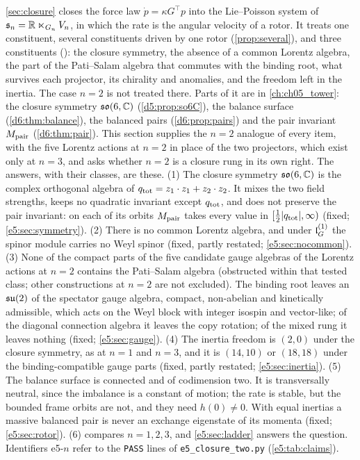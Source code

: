 \cref{sec:closure} closes the force law $\dot p=\kappa G^{\!\top}p$ into the Lie--Poisson system of $\mathfrak s_n=\mathbb{R}\ltimes_{G_n}V_n$,
in which the rate is the angular velocity of a rotor. It treats one constituent, several constituents driven by one rotor (\cref{prop:several}), and three constituents (): the closure symmetry, the absence of a common Lorentz
algebra, the part of the Pati--Salam algebra that commutes with the binding root, what survives each projector, its chirality and
anomalies, and the freedom left in the inertia. The case $n=2$ is not treated there. Parts of it are in \cref{ch:ch05_tower}: the closure symmetry $\mathfrak{so}(6,\mathbb{C})$ (\cref{d5:prop:so6C}), the balance surface (\cref{d6:thm:balance}), the balanced pairs (\cref{d6:prop:pairs}) and the pair invariant $M_{\rm pair}$ (\cref{d6:thm:pair}). This section supplies the $n=2$ analogue of every item, with the five Lorentz actions at $n=2$ in place of the two
projectors, which exist only at $n=3$, and asks whether $n=2$ is a closure rung in its own right. The answers, with their classes, are these. (1) The closure symmetry $\mathfrak{so}(6,\mathbb{C})$ is the complex orthogonal algebra of
$q_{\rm tot}=z_1\cdot z_1+z_2\cdot z_2$. It mixes the two field strengths, keeps no quadratic invariant except $q_{\rm tot}$, and does not
preserve the pair invariant: on each of its orbits $M_{\rm pair}$ takes every value in $[\tfrac12|q_{\rm tot}|,\infty)$ (fixed;
\cref{e5:sec:symmetry}). (2) There is no common Lorentz algebra, and under $\mathfrak l_G^{(1)}$ the spinor module carries no Weyl spinor
(fixed, partly restated; \cref{e5:sec:nocommon}). (3) None of the compact parts of the five candidate gauge algebras of the Lorentz actions at $n=2$ contains the Pati--Salam algebra (obstructed within that tested class; other constructions at $n=2$ are not excluded). The binding root leaves an
$\mathfrak{su}(2)$ of the spectator gauge algebra, compact, non-abelian and kinetically admissible, which acts on the Weyl block with integer
isospin and vector-like; of the diagonal connection algebra it leaves the copy rotation; of the mixed rung it leaves nothing (fixed;
\cref{e5:sec:gauge}). (4) The inertia freedom is $(2,0)$ under the closure symmetry, as at $n=1$ and $n=3$, and it is $(14,10)$ or $(18,18)$
under the binding-compatible gauge parts (fixed, partly restated; \cref{e5:sec:inertia}). (5) The balance surface is connected and of
codimension two. It is transversally neutral, since the imbalance is a constant of motion; the rate is stable, but the bounded frame orbits
are not, and they need $h(0)\neq0$. With equal inertias a massive balanced pair is never an exchange eigenstate of its momenta
(fixed; \cref{e5:sec:rotor}).
(6)  compares $n=1,2,3$, and \cref{e5:sec:ladder} answers the question. Identifiers e5-$n$ refer to the \texttt{PASS}
lines of \texttt{e5\_closure\_two.py} (\cref{e5:tab:claims}).

